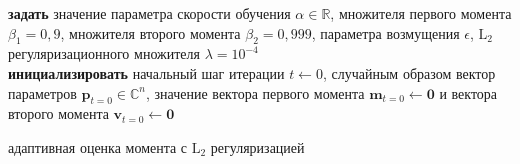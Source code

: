 \begin{algorithm}[H]
    \renewcommand{\algorithmcfname}{Adam}
    \textbf{задать} значение параметра скорости обучения $\alpha\in\mathbb{R}$, множителя первого момента  $\beta_1=0,9$, множителя второго момента  $\beta_2=0,999$, параметра возмущения $\epsilon$, $\text{L}_2$ регуляризационного множителя $\lambda=10^{-4}$\\
    \textbf{инициализировать} начальный шаг итерации $t \leftarrow 0$, случайным образом вектор параметров $\mathbf{p}_{t=0}\in\mathbb{C}^n$, значение вектора первого момента $\mathbf{m}_{t=0} \leftarrow \mathbf{0}$ и вектора второго момента $\mathbf{v}_{t=0} \leftarrow \mathbf{0}$ \\
    \caption{адаптивная оценка момента с $\text{L}_2$ регуляризацией}
\end{algorithm}